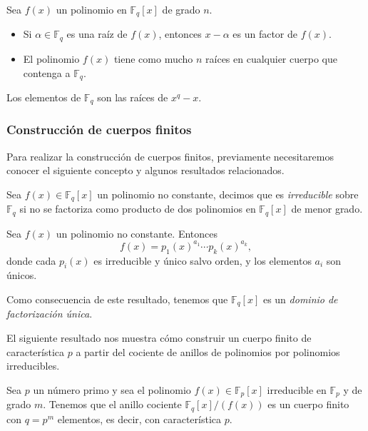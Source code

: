 \begin{proposition}
    Sea $f(x)$ un polinomio en $\mathbb{F}_q[x]$ de grado $n$.
    \begin{itemize}
        \item Si $\alpha \in \mathbb{F}_q$ es una raíz de $f(x)$, entonces $x - \alpha$ es un factor de $f(x)$.
        \item El polinomio $f(x)$ tiene como mucho $n$ raíces en cualquier cuerpo que contenga a $\mathbb{F}_q$.
    \end{itemize}
\end{proposition}

\begin{theorem}
    Los elementos de $\mathbb{F}_q$ son las raíces de $x^q - x$.
\end{theorem}

\subsubsection{Construcción de cuerpos finitos}

Para realizar la construcción de cuerpos finitos, previamente necesitaremos conocer el siguiente concepto y algunos resultados relacionados.

\begin{definition}
    Sea $f(x) \in \mathbb{F}_q[x]$ un polinomio no constante, decimos que es \emph{irreducible} sobre $\mathbb{F}_q$ si no se factoriza como producto de dos polinomios en $\mathbb{F}_q[x]$ de menor grado.
\end{definition}

\begin{theorem}
    Sea $f(x)$ un polinomio no constante. Entonces
    \[
        f(x) = p_1(x)^{a_1} \cdots p_k(x)^{a_k},
    \]
    donde cada $p_i(x)$ es irreducible y único salvo orden, y los elementos $a_i$ son únicos.
\end{theorem}

Como consecuencia de este resultado, tenemos que $\mathbb{F}_q[x]$ es un \emph{dominio de factorización única}.

El siguiente resultado nos muestra cómo construir un cuerpo finito de característica $p$ a partir del cociente de anillos de polinomios por polinomios irreducibles.

\begin{proposition}
    Sea $p$ un número primo y sea el polinomio $f(x) \in \mathbb{F}_p[x]$ irreducible en $\mathbb{F}_p$ y de grado $m$. Tenemos que el anillo cociente $\mathbb{F}_q[x]/\left(f(x)\right)$ es un cuerpo finito con $q = p^m$ elementos, es decir, con característica $p$.
\end{proposition}

